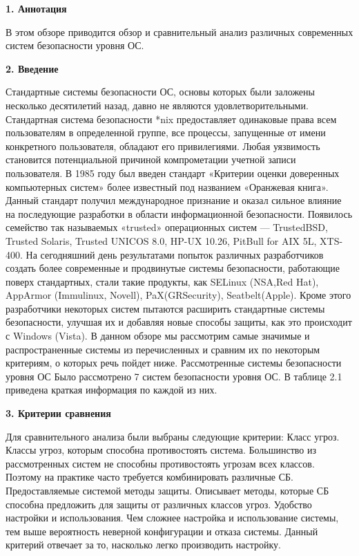{\bfseries 1. Аннотация} 

В этом обзоре приводится обзор и сравнительный анализ различных современных систем безопасности уровня ОС. 

\bigskip
{\bfseries 2. Введение} 

Стандартные системы безопасности ОС, основы которых были заложены несколько десятилетий назад, давно не являются удовлетворительными. Стандартная система безопасности *nix предоставляет одинаковые права всем пользователям в определенной группе, все процессы, запущенные от имени конкретного пользователя, обладают его привилегиями. Любая уязвимость становится потенциальной причиной компрометации учетной записи пользователя. В 1985 году был введен стандарт «Критерии оценки доверенных компьютерных систем» более известный под названием «Оранжевая книга». Данный стандарт получил международное признание и оказал сильное влияние на последующие разработки в области информационной безопасности. Появилось семейство так называемых «trusted» операционных систем — TrustedBSD, Trusted Solaris, Trusted UNICOS 8.0, HP-UX 10.26, PitBull for AIX 5L, XTS-400. На сегодняшний день результатами попыток различных разработчиков создать более современные и продвинутые системы безопасности, работающие поверх стандартных, стали такие продукты, как SELinux (NSA,Red Hat), AppArmor (Immulinux, Novell), PaX(GRSecurity), Seatbelt(Apple). Кроме этого разработчики некоторых систем пытаются расширить стандартные системы безопасности, улучшая их и добавляя новые способы защиты, как это происходит с Windows (Vista). В данном обзоре мы рассмотрим самые значимые и распространенные системы из перечисленных и сравним их по некоторым критериям, о которых речь пойдет ниже.
Рассмотренные системы безопасности уровня ОС 
Было рассмотрено 7 систем безопасности уровня ОС. В таблице 2.1 приведена краткая информация по каждой из них. 

\bigskip 
{\bfseries 3. Критерии сравнения} 

Для сравнительного анализа были выбраны следующие критерии: 
Класс угроз. Классы угроз, которым способна противостоять система. Большинство из рассмотренных систем не способны противостоять угрозам всех классов. Поэтому на практике часто требуется комбинировать различные СБ. 
Предоставляемые системой методы защиты. Описывает методы, которые СБ способна предложить для защиты от различных классов угроз. 
Удобство настройки и использования. Чем сложнее настройка и использование системы, тем выше вероятность неверной конфигурации и отказа системы. Данный критерий отвечает за то, насколько легко производить настройку. 

